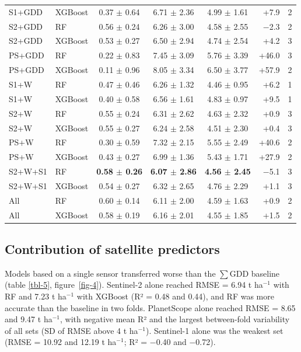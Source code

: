 \documentclass[
  british,
]{interact}
\begin{document}
\begin{table}
{\begin{tabular}{l l c c c r c}
S1+GDD & XGBoost & 0.37 $\pm$ 0.64 & 6.71 $\pm$ 2.36 & 4.99 $\pm$ 1.61 & +7.9 & 2 \\
S2+GDD & RF & 0.56 $\pm$ 0.24 & 6.26 $\pm$ 3.00 & 4.58 $\pm$ 2.55 & $-$2.3 & 2 \\
S2+GDD & XGBoost & 0.53 $\pm$ 0.27 & 6.50 $\pm$ 2.94 & 4.74 $\pm$ 2.54 & +4.2 & 3 \\
PS+GDD & RF & 0.22 $\pm$ 0.83 & 7.45 $\pm$ 3.09 & 5.76 $\pm$ 3.39 & +46.0 & 3 \\
PS+GDD & XGBoost & 0.11 $\pm$ 0.96 & 8.05 $\pm$ 3.34 & 6.50 $\pm$ 3.77 & +57.9 & 2 \\
\midrule
S1+W & RF & 0.47 $\pm$ 0.46 & 6.26 $\pm$ 1.32 & 4.46 $\pm$ 0.95 & +6.2 & 1 \\
S1+W & XGBoost & 0.40 $\pm$ 0.58 & 6.56 $\pm$ 1.61 & 4.83 $\pm$ 0.97 & +9.5 & 1 \\
S2+W & RF & 0.55 $\pm$ 0.24 & 6.31 $\pm$ 2.62 & 4.63 $\pm$ 2.32 & +0.9 & 3 \\
S2+W & XGBoost & 0.55 $\pm$ 0.27 & 6.24 $\pm$ 2.58 & 4.51 $\pm$ 2.30 & +0.4 & 3 \\
PS+W & RF & 0.30 $\pm$ 0.59 & 7.32 $\pm$ 2.15 & 5.55 $\pm$ 2.49 & +40.6 & 2 \\
PS+W & XGBoost & 0.43 $\pm$ 0.27 & 6.99 $\pm$ 1.36 & 5.43 $\pm$ 1.71 & +27.9 & 2 \\
S2+W+S1 & RF & \textbf{0.58 $\pm$ 0.26} & \textbf{6.07 $\pm$ 2.86} & \textbf{4.56 $\pm$ 2.45} & $-$5.1 & 3 \\
S2+W+S1 & XGBoost & 0.54 $\pm$ 0.27 & 6.32 $\pm$ 2.65 & 4.76 $\pm$ 2.29 & +1.1 & 3 \\
\midrule
All & RF & 0.60 $\pm$ 0.14 & 6.11 $\pm$ 2.00 & 4.59 $\pm$ 1.63 & +0.9 & 2 \\
All & XGBoost & 0.58 $\pm$ 0.19 & 6.16 $\pm$ 2.01 & 4.55 $\pm$ 1.85 & +1.5 & 2 \\
\bottomrule
\end{tabular}

}

\end{table}%

\subsection{Contribution of satellite
predictors}\label{contribution-of-satellite-predictors}

Models based on a single sensor transferred worse than the \(\sum\)GDD
baseline (table \ref{tbl-5}, figure~\ref{fig-4}). Sentinel-2 alone
reached RMSE = 6.94 t ha\(^{-1}\) with RF and 7.23 t ha\(^{-1}\) with
XGBoost (R² = 0.48 and 0.44), and RF was more accurate than the baseline
in two folds. PlanetScope alone reached RMSE = 8.65 and 9.47 t
ha\(^{-1}\), with negative mean R² and the largest between-fold
variability of all sets (SD of RMSE above 4 t ha\(^{-1}\)). Sentinel-1
alone was the weakest set (RMSE = 10.92 and 12.19 t ha\(^{-1}\); R² =
−0.40 and −0.72).
\end{document}
